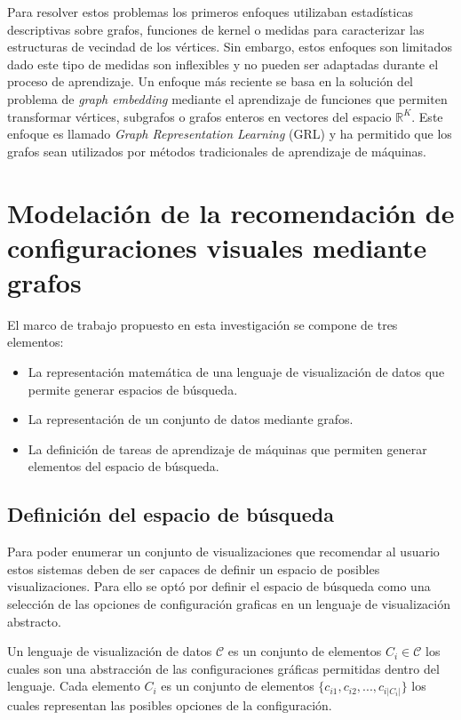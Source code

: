 Para resolver estos problemas los primeros enfoques utilizaban estad\'isticas
descriptivas sobre grafos, funciones de kernel o medidas para caracterizar las
estructuras de vecindad de los v\'ertices. Sin embargo, estos enfoques son limitados
dado este tipo de medidas son inflexibles y no pueden ser adaptadas durante el proceso
de aprendizaje. Un enfoque m\'as reciente
se basa en la soluci\'on del problema de \textit{graph embedding} mediante el aprendizaje
de funciones que permiten transformar v\'ertices, subgrafos o grafos enteros en
vectores del espacio $\mathbb{R}^K$. Este enfoque es
llamado \textit{Graph Representation Learning} (GRL) y ha permitido que
los grafos sean utilizados por m\'etodos tradicionales de aprendizaje de m\'aquinas.


\section{Modelaci\'on de la recomendaci\'on de configuraciones visuales mediante grafos}\label{section:graph-framework}

El marco de trabajo propuesto en esta investigaci\'on se compone de tres elementos:

\begin{itemize}
    \item La representaci\'on matem\'atica de una lenguaje de visualizaci\'on de datos que permite generar espacios de b\'usqueda.
    \item La representaci\'on de un conjunto de datos mediante grafos.
    \item La definici\'on de tareas de aprendizaje de m\'aquinas que permiten generar elementos del espacio de b\'usqueda.
\end{itemize}

\subsection{Definici\'on del espacio de b\'usqueda}

Para poder enumerar un conjunto de visualizaciones que recomendar
al usuario estos sistemas deben de ser capaces de definir un espacio
de posibles visualizaciones. Para ello se opt\'o por definir el
espacio de b\'usqueda como una selecci\'on de las opciones de configuraci\'on
graficas en un lenguaje de visualizaci\'on abstracto.

\begin{definition}
    Un lenguaje de visualizaci\'on de datos $\mathcal{C}$ es un
    conjunto de elementos $C_i \in \mathcal{C}$ los cuales son una
    abstracci\'on de las configuraciones gr\'aficas permitidas dentro
    del lenguaje. Cada elemento $C_i$ es un conjunto de elementos
    $\{ c_{i1}, c_{i2},..., c_{i|C_i|}\}$ los cuales representan las
    posibles opciones de la configuraci\'on.
\end{definition}

